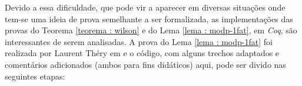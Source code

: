 Devido a essa dificuldade, que pode vir a aparecer em diversas situações onde tem-se uma ideia de prova semelhante a ser formalizada, as implementações das provas do Teorema \ref{teorema : wilson} e do Lema \ref{lema : modp-1fat}, em \textit{Coq}, são interessantes de serem analisadas. A prova do Lema \ref{lema : modp-1fat} foi realizada por Laurent Théry em \cite{mathcomp-extra-euler} e o código, com alguns trechos adaptados e comentários adicionados (ambos para fins didáticos) aqui, pode ser divido nas seguintes etapas:


